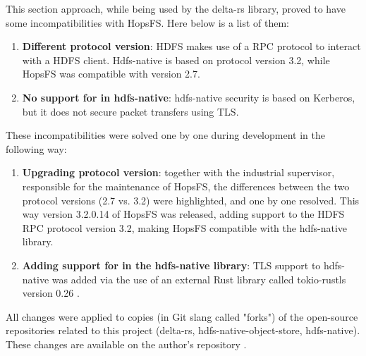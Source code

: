 This section approach, while being used by the delta-rs library, proved to have some incompatibilities with \gls{HopsFS}. Here below is a list of them:
\begin{enumerate}
  \item \textbf{Different  protocol version}: \gls{HDFS} makes use of a \gls{RPC} protocol to interact with a \gls{HDFS} client. Hdfs-native is based on protocol version 3.2, while \gls{HopsFS} was compatible with version 2.7.
  \item \textbf{No support for  in hdfs-native}: hdfs-native security is based on Kerberos, but it does not secure packet transfers using \gls{TLS}.
\end{enumerate}
These incompatibilities were solved one by one during development in the following way:
\begin{enumerate}
  \item \textbf{Upgrading  protocol version}: together with the industrial supervisor, responsible for the maintenance of \gls{HopsFS}, the differences between the two protocol versions (2.7 vs. 3.2) were highlighted, and one by one resolved. This way version 3.2.0.14 of \gls{HopsFS} was released, adding support to the \gls{HDFS} \gls{RPC} protocol version 3.2, making \gls{HopsFS} compatible with the hdfs-native library.
  \item \textbf{Adding support for  in the hdfs-native library}: \gls{TLS} support to hdfs-native was added via the use of an external Rust library called tokio-rustls version 0.26 \cite{RustlsTokiorustlsAsync}.
\end{enumerate}

All changes were applied to copies (in Git slang called "forks") of the open-source repositories related to this project (delta-rs, hdfs-native-object-store, hdfs-native). These changes are available on the author's repository \cite{manfrediSilemoHdfsnative2024, manfrediSilemoHdfsnativeobjectstore2024, manfrediSilemoDeltars2024}.